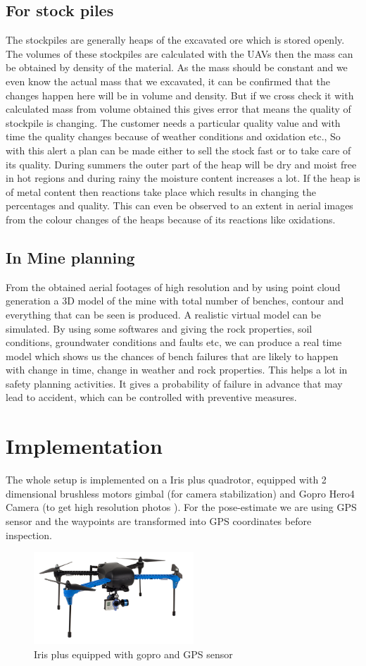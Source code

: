 \documentclass[conference]{IEEEtran}
\begin{document}
\subsection{For stock piles}
The stockpiles are generally heaps of the excavated ore which is stored openly. The volumes of these stockpiles are calculated with the UAVs then the mass can be obtained by density of the material. As the mass should be constant and  we even  know the actual mass that we excavated, it can be confirmed that the changes happen here will be in volume and density. But if we cross check it with calculated mass from volume obtained this gives error that means the quality of stockpile is changing. The customer needs a particular quality value and with time the quality changes because of weather conditions and oxidation etc., So with this alert a plan can be made either to sell the stock fast or to take care of its quality. During summers the outer part of the heap will be dry and moist free in hot regions and during rainy the moisture content increases a lot. If the heap is of metal content then reactions take place which results in changing the percentages and quality. This can even be observed to an extent in aerial images from the colour changes of the heaps because of its reactions like oxidations. 

\subsection{In Mine planning}
From the obtained aerial footages of high resolution and by using point cloud generation a 3D model of the mine with total number of benches, contour and everything that can be seen is produced. A realistic virtual model can be simulated. By using some softwares and giving the rock properties, soil conditions, groundwater conditions and faults etc, we can produce a real time model which shows us the chances of bench failures that are likely to happen with change in time, change in weather and rock properties. This helps a lot in safety planning activities. It gives a probability of failure in advance that may lead to accident, which can be controlled with preventive measures.
\section{Implementation}
The whole setup is implemented on a Iris plus quadrotor, equipped with 2 dimensional brushless motors gimbal (for camera stabilization) and Gopro Hero4 Camera (to get high resolution photos ). For the pose-estimate we are using GPS sensor and the waypoints are transformed into GPS coordinates before inspection. 
\begin{figure}[h]
\includegraphics[width=6cm]{iris.png}
\centering
\caption{ Iris plus equipped with gopro and GPS sensor}
\label{iris_img}
\end{figure}
\end{document}
